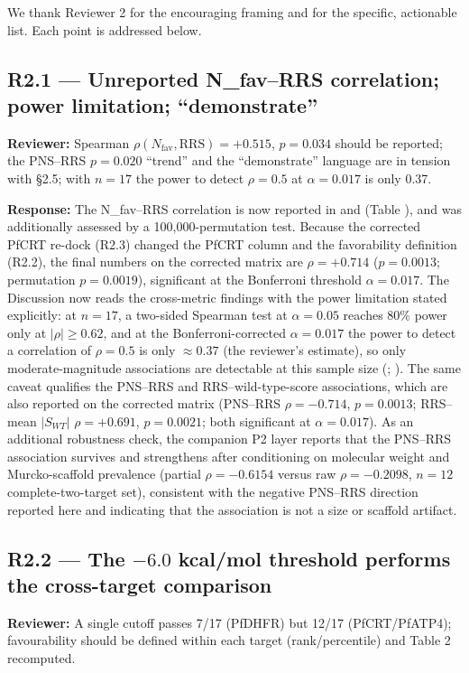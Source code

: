 \documentclass[11pt]{article}
\begin{document}
We thank Reviewer 2 for the encouraging framing and for the specific, actionable list. Each
point is addressed below.

\subsection*{R2.1 --- Unreported N\_fav--RRS correlation; power limitation; ``demonstrate''}
\textbf{Reviewer:} Spearman $\rho(N_{\mathrm{fav}},\mathrm{RRS})=+0.515$, $p=0.034$ should be
reported; the PNS--RRS $p=0.020$ ``trend'' and the ``demonstrate'' language are in tension
with \S2.5; with $n=17$ the power to detect $\rho=0.5$ at $\alpha=0.017$ is only 0.37.

\textbf{Response:} The N\_fav--RRS correlation is now reported in  and  (Table ), and was additionally assessed by a 100{,}000-permutation test.
Because the corrected PfCRT re-dock (R2.3) changed the PfCRT column and the
favorability definition (R2.2), the final numbers on the corrected matrix are
$\rho=+0.714$ ($p=0.0013$; permutation $p=0.0019$), significant at the
Bonferroni threshold $\alpha=0.017$. The Discussion now reads the cross-metric
findings with the power limitation stated explicitly: at $n=17$, a two-sided
Spearman test at $\alpha=0.05$ reaches 80\% power only at $|\rho|\ge0.62$, and
at the Bonferroni-corrected $\alpha=0.017$ the power to detect a correlation of
$\rho=0.5$ is only $\approx0.37$ (the reviewer's estimate), so only
moderate-magnitude associations are detectable at this sample size
(; ). The same caveat qualifies the PNS--RRS and
RRS--wild-type-score associations, which are also reported on the corrected
matrix (PNS--RRS $\rho=-0.714$, $p=0.0013$; RRS--mean $|S_{WT}|$ $\rho=+0.691$,
$p=0.0021$; both significant at $\alpha=0.017$). As an additional robustness
check, the companion P2 layer reports that the PNS--RRS association survives and
strengthens after conditioning on molecular weight and Murcko-scaffold prevalence
(partial $\rho=-0.6154$ versus raw $\rho=-0.2098$, $n=12$ complete-two-target
set), consistent with the negative PNS--RRS direction reported here and
indicating that the association is not a size or scaffold artifact.

\subsection*{R2.2 --- The $-6.0$ kcal/mol threshold performs the cross-target comparison}
\textbf{Reviewer:} A single cutoff passes 7/17 (PfDHFR) but 12/17 (PfCRT/PfATP4); favourability
should be defined within each target (rank/percentile) and Table 2 recomputed.
\end{document}
